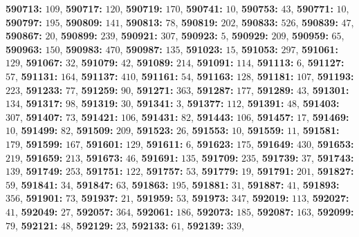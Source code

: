 \textsf{\bfseries 590713:} $109$, \textsf{\bfseries 590717:} $120$, \textsf{\bfseries 590719:} $170$, \textsf{\bfseries 590741:} $10$, \textsf{\bfseries 590753:} $43$, \textsf{\bfseries 590771:} $10$, \textsf{\bfseries 590797:} $195$, \textsf{\bfseries 590809:} $141$, \textsf{\bfseries 590813:} $78$, \textsf{\bfseries 590819:} $202$, \textsf{\bfseries 590833:} $526$, \textsf{\bfseries 590839:} $47$, \textsf{\bfseries 590867:} $20$, \textsf{\bfseries 590899:} $239$, \textsf{\bfseries 590921:} $307$, \textsf{\bfseries 590923:} $5$, \textsf{\bfseries 590929:} $209$, \textsf{\bfseries 590959:} $65$, \textsf{\bfseries 590963:} $150$, \textsf{\bfseries 590983:} $470$, \textsf{\bfseries 590987:} $135$, \textsf{\bfseries 591023:} $15$, \textsf{\bfseries 591053:} $297$, \textsf{\bfseries 591061:} $129$, \textsf{\bfseries 591067:} $32$, \textsf{\bfseries 591079:} $42$, \textsf{\bfseries 591089:} $214$, \textsf{\bfseries 591091:} $114$, \textsf{\bfseries 591113:} $6$, \textsf{\bfseries 591127:} $57$, \textsf{\bfseries 591131:} $164$, \textsf{\bfseries 591137:} $410$, \textsf{\bfseries 591161:} $54$, \textsf{\bfseries 591163:} $128$, \textsf{\bfseries 591181:} $107$, \textsf{\bfseries 591193:} $223$, \textsf{\bfseries 591233:} $77$, \textsf{\bfseries 591259:} $90$, \textsf{\bfseries 591271:} $363$, \textsf{\bfseries 591287:} $177$, \textsf{\bfseries 591289:} $43$, \textsf{\bfseries 591301:} $134$, \textsf{\bfseries 591317:} $98$, \textsf{\bfseries 591319:} $30$, \textsf{\bfseries 591341:} $3$, \textsf{\bfseries 591377:} $112$, \textsf{\bfseries 591391:} $48$, \textsf{\bfseries 591403:} $307$, \textsf{\bfseries 591407:} $73$, \textsf{\bfseries 591421:} $106$, \textsf{\bfseries 591431:} $82$, \textsf{\bfseries 591443:} $106$, \textsf{\bfseries 591457:} $17$, \textsf{\bfseries 591469:} $10$, \textsf{\bfseries 591499:} $82$, \textsf{\bfseries 591509:} $209$, \textsf{\bfseries 591523:} $26$, \textsf{\bfseries 591553:} $10$, \textsf{\bfseries 591559:} $11$, \textsf{\bfseries 591581:} $179$, \textsf{\bfseries 591599:} $167$, \textsf{\bfseries 591601:} $129$, \textsf{\bfseries 591611:} $6$, \textsf{\bfseries 591623:} $175$, \textsf{\bfseries 591649:} $430$, \textsf{\bfseries 591653:} $219$, \textsf{\bfseries 591659:} $213$, \textsf{\bfseries 591673:} $46$, \textsf{\bfseries 591691:} $135$, \textsf{\bfseries 591709:} $235$, \textsf{\bfseries 591739:} $37$, \textsf{\bfseries 591743:} $139$, \textsf{\bfseries 591749:} $253$, \textsf{\bfseries 591751:} $122$, \textsf{\bfseries 591757:} $53$, \textsf{\bfseries 591779:} $19$, \textsf{\bfseries 591791:} $201$, \textsf{\bfseries 591827:} $59$, \textsf{\bfseries 591841:} $34$, \textsf{\bfseries 591847:} $63$, \textsf{\bfseries 591863:} $195$, \textsf{\bfseries 591881:} $31$, \textsf{\bfseries 591887:} $41$, \textsf{\bfseries 591893:} $356$, \textsf{\bfseries 591901:} $73$, \textsf{\bfseries 591937:} $21$, \textsf{\bfseries 591959:} $53$, \textsf{\bfseries 591973:} $347$, \textsf{\bfseries 592019:} $113$, \textsf{\bfseries 592027:} $41$, \textsf{\bfseries 592049:} $27$, \textsf{\bfseries 592057:} $364$, \textsf{\bfseries 592061:} $186$, \textsf{\bfseries 592073:} $185$, \textsf{\bfseries 592087:} $163$, \textsf{\bfseries 592099:} $79$, \textsf{\bfseries 592121:} $48$, \textsf{\bfseries 592129:} $23$, \textsf{\bfseries 592133:} $61$, \textsf{\bfseries 592139:} $339$, 
